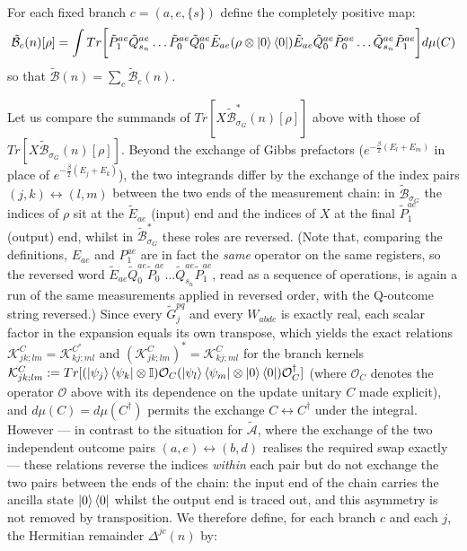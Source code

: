 \documentclass[aps,floatfix,10pt,amssymb,amsfont,amsmath,superscriptaddress,float,nofootinbib,longbibliography,nobalancelastpage,twocolumn]{revtex4-2}
\begin{document}
\begin{widetext}
\begin{multline}
\end{multline}
For each fixed branch $c = (a,e,\{s\})$ define the completely positive map:
\begin{equation}
    \tilde{\mathcal{B}}_{c}(n)[\rho] = \int Tr\bigg[\tilde P^{ae}_1\tilde Q^{ae}_{s_n}\ldots \tilde P^{ae}_0\tilde Q^{ae}_0\tilde E_{ae} ( \rho\otimes \ket{0}\bra{0})\tilde E_{ae}\tilde Q^{ae}_0\tilde P^{ae}_0\ldots \tilde Q^{ae}_{s_n}\tilde P^{ae}_1\bigg]d\mu(C)
\end{equation}
so that $\tilde{\mathcal{B}}(n) = \sum_c \tilde{\mathcal{B}}_c(n)$.

Let us compare the summands of $Tr[X\tilde{\mathcal{B}}^*_{\sigma_G}(n)[\rho]]$ above with those of $Tr[X\tilde{\mathcal{B}}_{\sigma_G}(n)[\rho]]$. Beyond the exchange of Gibbs prefactors ($e^{-\frac{\beta}{2}(E_l+E_m)}$ in place of $e^{-\frac{\beta}{2}(E_j+E_k)}$), the two integrands differ by the exchange of the index pairs $(j,k) \leftrightarrow (l,m)$ between the two ends of the measurement chain: in $\tilde{\mathcal{B}}_{\sigma_G}$ the indices of $\rho$ sit at the $\tilde E_{ae}$ (input) end and the indices of $X$ at the final $\tilde P^{ae}_1$ (output) end, whilst in $\tilde{\mathcal{B}}^*_{\sigma_G}$ these roles are reversed. (Note that, comparing the definitions, $E_{ae}$ and $P^{ae}_1$ are in fact the \emph{same} operator on the same registers, so the reversed word $\tilde E_{ae}\tilde Q^{ae}_0\tilde P^{ae}_0\ldots\tilde Q^{ae}_{s_n}\tilde P^{ae}_1$, read as a sequence of operations, is again a run of the same measurements applied in reversed order, with the Q-outcome string reversed.) Since every $\tilde G^{pq}_j$ and every $W_{abde}$ is exactly real, each scalar factor in the expansion equals its own transpose, which yields the exact relations $\mathcal{K}^{C}_{jk;lm} = \mathcal{K}^{C^*}_{kj;ml}$ and $(\mathcal{K}^{C}_{jk;lm})^* = \mathcal{K}^{C}_{kj;ml}$ for the branch kernels $\mathcal{K}^{C}_{jk;lm} := Tr[(\ket{\psi_j}\bra{\psi_k}\otimes\mathbb{I})\mathcal{O}_C(\ket{\psi_l}\bra{\psi_m}\otimes\ket{0}\bra{0})\mathcal{O}_C^{\dagger}]$ (where $\mathcal{O}_C$ denotes the operator $\mathcal{O}$ above with its dependence on the update unitary $C$ made explicit), and $d\mu(C)=d\mu(C^{\dagger})$ permits the exchange $C \leftrightarrow C^{\dagger}$ under the integral. However --- in contrast to the situation for $\tilde{\mathcal{A}}$, where the exchange of the two independent outcome pairs $(a,e)\leftrightarrow(b,d)$ realises the required swap exactly --- these relations reverse the indices \emph{within} each pair but do not exchange the two pairs between the ends of the chain: the input end of the chain carries the ancilla state $\ket{0}\bra{0}$ whilst the output end is traced out, and this asymmetry is not removed by transposition. We therefore define, for each branch $c$ and each $j$, the Hermitian remainder $\Delta^{jc}(n)$ by:

\end{widetext}
\end{document}
